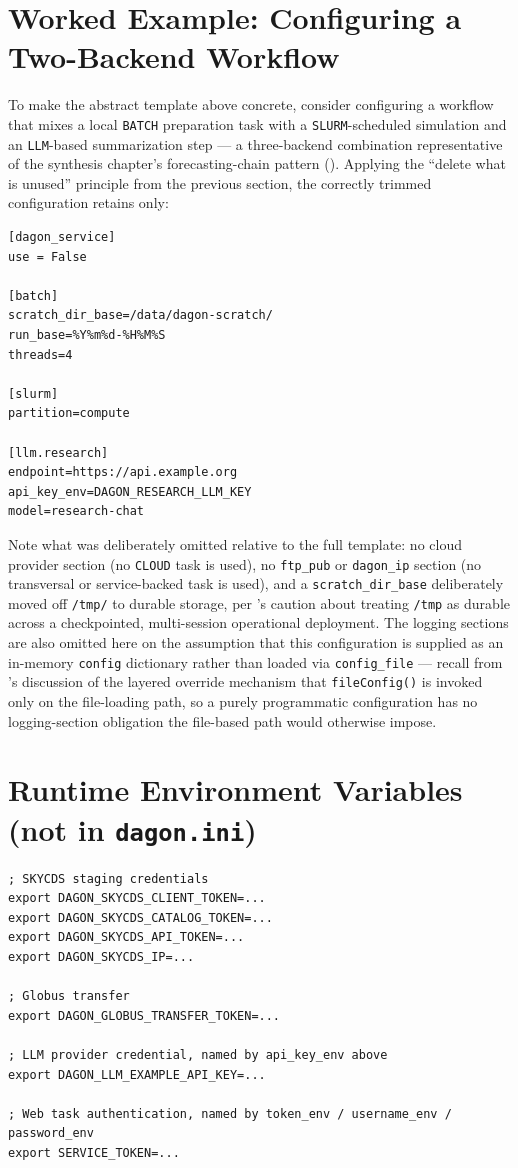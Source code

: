 \section{Worked Example: Configuring a Two-Backend Workflow}

To make the abstract template above concrete, consider configuring a
workflow that mixes a local \texttt{BATCH} preparation task with a
\texttt{SLURM}-scheduled simulation and an \texttt{LLM}-based summarization
step --- a three-backend combination representative of the synthesis
chapter's forecasting-chain pattern (). Applying the
``delete what is unused'' principle from the previous section, the correctly
trimmed configuration retains only:

\begin{lstlisting}[style=ini]
[dagon_service]
use = False

[batch]
scratch_dir_base=/data/dagon-scratch/
run_base=%Y%m%d-%H%M%S
threads=4

[slurm]
partition=compute

[llm.research]
endpoint=https://api.example.org
api_key_env=DAGON_RESEARCH_LLM_KEY
model=research-chat
\end{lstlisting}

Note what was deliberately omitted relative to the full template: no cloud
provider section (no \texttt{CLOUD} task is used), no \texttt{ftp\_pub} or
\texttt{dagon\_ip} section (no transversal or service-backed task is used),
and a \texttt{scratch\_dir\_base} deliberately moved off \texttt{/tmp/} to
durable storage, per 's caution about treating
\texttt{/tmp} as durable across a checkpointed, multi-session operational
deployment. The logging sections are also omitted here on the assumption
that this configuration is supplied as an in-memory \texttt{config}
dictionary rather than loaded via \texttt{config\_file} --- recall from
's discussion of the layered override mechanism that
\texttt{fileConfig()} is invoked only on the file-loading path, so a purely
programmatic configuration has no logging-section obligation the file-based
path would otherwise impose.

\section{Runtime Environment Variables (not in \texttt{dagon.ini})}

\begin{lstlisting}[style=bash]
; SKYCDS staging credentials
export DAGON_SKYCDS_CLIENT_TOKEN=...
export DAGON_SKYCDS_CATALOG_TOKEN=...
export DAGON_SKYCDS_API_TOKEN=...
export DAGON_SKYCDS_IP=...

; Globus transfer
export DAGON_GLOBUS_TRANSFER_TOKEN=...

; LLM provider credential, named by api_key_env above
export DAGON_LLM_EXAMPLE_API_KEY=...

; Web task authentication, named by token_env / username_env / password_env
export SERVICE_TOKEN=...
\end{lstlisting}

